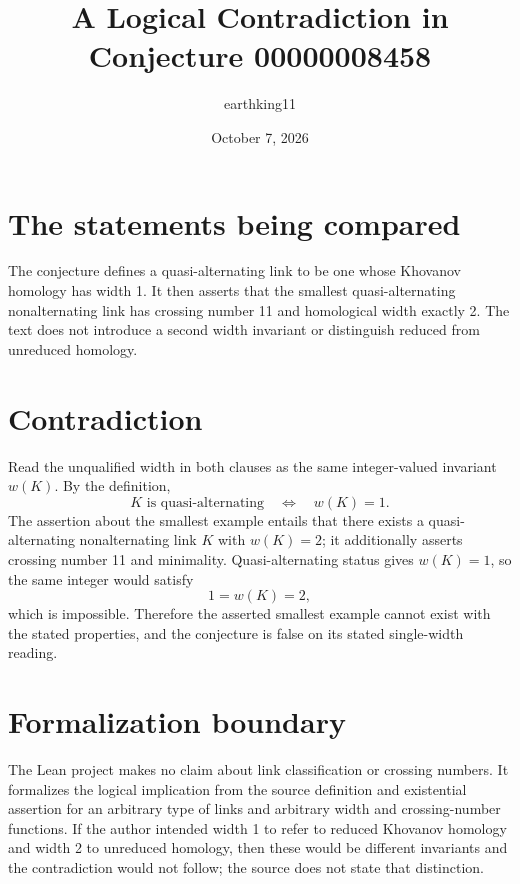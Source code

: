 \documentclass[11pt]{article}
\title{A Logical Contradiction in Conjecture 00000008458}
\author{earthking11}
\date{October 7, 2026}
\begin{document}
\maketitle

\section*{The statements being compared}
The conjecture defines a quasi-alternating link to be one whose Khovanov homology has width 1. It then asserts that the smallest quasi-alternating nonalternating link has crossing number 11 and homological width exactly 2. The text does not introduce a second width invariant or distinguish reduced from unreduced homology.

\section*{Contradiction}
Read the unqualified width in both clauses as the same integer-valued invariant $w(K)$. By the definition,
\[
  K\text{ is quasi-alternating}\quad\Longleftrightarrow\quad w(K)=1.
\]
The assertion about the smallest example entails that there exists a quasi-alternating nonalternating link $K$ with $w(K)=2$; it additionally asserts crossing number 11 and minimality. Quasi-alternating status gives $w(K)=1$, so the same integer would satisfy
\[
  1=w(K)=2,
\]
which is impossible. Therefore the asserted smallest example cannot exist with the stated properties, and the conjecture is false on its stated single-width reading.

\section*{Formalization boundary}
The Lean project makes no claim about link classification or crossing numbers. It formalizes the logical implication from the source definition and existential assertion for an arbitrary type of links and arbitrary width and crossing-number functions. If the author intended width 1 to refer to reduced Khovanov homology and width 2 to unreduced homology, then these would be different invariants and the contradiction would not follow; the source does not state that distinction.
\end{document}
